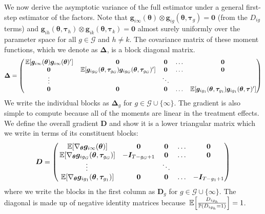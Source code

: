 We now derive the asymptotic variance of the full estimator under a general first-step estimator of the factors. Note that $\bm g_{i\infty}(\bm{\theta}) \otimes \bm g_{ig}(\bm{\theta}, \bm \tau_g) = \bm 0$ (from the $D_{ig}$ terms) and $\bm g_{ih}(\bm{\theta}, \bm \tau_h) \otimes \bm g_{ik}(\bm{\theta}, \bm \tau_k) = \bm 0$ almost surely uniformly over the parameter space for all $g \in \mathcal{G}$ and $h \neq k$. The covariance matrix of these moment functions, which we denote as $\bm \Delta$, is a block diagonal matrix.
\begin{equation*}
    \bm \Delta =
    \begin{pmatrix}
        \expec{\bm g_{i \infty}(\bm{\theta}) \bm g_{i \infty}(\bm{\theta})'} & \bm 0 & \bm 0 & \hdots & \bm 0\\
        \bm 0 &  \expec{\bm g_{i g_G}(\bm{\theta}, \bm \tau_{g_G}) \bm g_{i g_G}(\bm{\theta}, \bm \tau_{g_G})' } & \bm 0 & \hdots & \bm 0\\
        \vdots & & \ddots  &\\
        \bm 0 & \bm 0 & \bm 0 & \hdots & \expec{ \bm g_{i g_1}(\bm{\theta}, \bm \tau_{g_1}) \bm g_{i g_1}(\bm{\theta}, \bm \tau)'}
    \end{pmatrix}
\end{equation*}
We write the individual blocks as $\bm \Delta_g$ for $g \in \mathcal{G} \cup \{ \infty \}$. The gradient is also simple to compute because all of the moments are linear in the treatment effects. We define the overall gradient $\bm D$ and show it is a lower triangular matrix which we write in terms of its constituent blocks:
\begin{equation*}
    \bm D = 
    \begin{pmatrix}
        \expec{\nabla_{\bm{\theta}} \bm g_{i\infty}(\bm{\theta}) } & \bm 0 & \bm 0 & \hdots & \bm 0\\
        \expec{\nabla_{\bm{\theta}} \bm g_{ig_G}(\bm{\theta}, \bm \tau_{g_G})} & -\bm I_{T - g_G + 1} & \bm 0 & \hdots & \bm 0\\
        \vdots & & \ddots  &\\
        \expec{\nabla_{\bm{\theta}} \bm g_{ig_1}(\bm{\theta}, \bm \tau_{g_1})} & \bm 0 & \bm 0 & \hdots & -\bm I_{T - g_1 + 1}
    \end{pmatrix}
\end{equation*}
where we write the blocks in the first column as $\bm D_g$ for $g \in \mathcal{G} \cup \{ \infty \}$. The diagonal is made up of negative identity matrices because $\expec{\frac{D_{ig_h}}{\mathbb{P}(D_{ig_h} = 1)}} = 1$.

